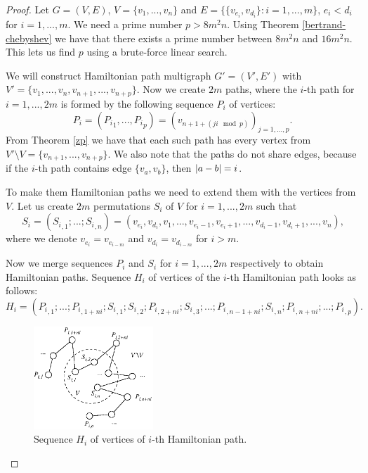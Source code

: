 \begin{proof}
Let $G = (V,E)$, $V = \{v_1, ..., v_n\}$ and $E = \{\{v_{e_i}, v_{d_i}\}: i = 1, ..., m\}$,
$e_i < d_i$ for $i=1,...,m$.
We need a prime number $p > 8m^2 n$.
Using Theorem \ref{bertrand-chebyshev} we have that there exists a prime number between $8m^2n$ and $16m^2 n$.
This lets us find $p$ using a brute-force linear search.

\sloppy
We will construct Hamiltonian path multigraph $G' = (V',E')$
with $V' = \{v_1, ..., v_n, v_{n+1}, ..., v_{n+p}\}$. 
Now we create $2m$ paths, where the $i$-th path for $i=1,...,2m$
is formed by the following sequence $P_i$ of vertices:
$$ P_i = ({P_i}_1, ..., {P_i}_p) =  (v_{n+1+(ji \mod p)})_{j=1,...,p} \text{.}$$ 
From Theorem \ref{zp} we have that each such path has every vertex from
$V' \setminus V = \{v_{n+1}, ..., v_{n+p}\}$.
We also note that the paths do not share edges,
because if the $i$-th path contains edge $\{v_a, v_b\}$, then $\left\vert a-b \right\vert = i$.

To make them Hamiltonian paths we need to extend them with the vertices from $V$.
Let us create $2m$ permutations $S_i$ of $V$ for $i=1,...,2m$ such that
$$S_i = ({S_i}_{,1}; ...; {S_i}_{,n}) =
(v_{e_i}, v_{d_i}, v_1, ..., v_{e_i-1}, v_{e_i+1}, ..., v_{d_i-1}, v_{d_i+1}, ..., v_n)\text{,}$$
where we denote $v_{e_i} = v_{e_{i-m}}$ and $v_{d_i} = v_{d_{i-m}}$ for $i>m$. 

Now we merge sequences $P_i$ and $S_i$ for $i=1,...,2m$ respectively to obtain Hamiltonian paths.
Sequence $H_i$ of vertices of the $i$-th Hamiltonian path looks as follows:
$$H_i = ({P_i}_{,1}; ...; {P_i}_{,1+ni}; {S_i}_{,1}; {S_i}_{,2}; {P_i}_{,2+ni}; {S_i}_{,3}; ...;
{P_i}_{,n-1+ni}; {S_i}_{,n}; {P_i}_{,n+ni}; ...; {P_i}_{,p}) \text{.}$$

\begin{figure}[h]
    \centering
    \includegraphics[width=0.4\textwidth]{path.eps}
    \caption{Sequence $H_i$ of vertices of $i$-th Hamiltonian path.}
    \label{fig:path}
\end{figure}


\end{proof}
